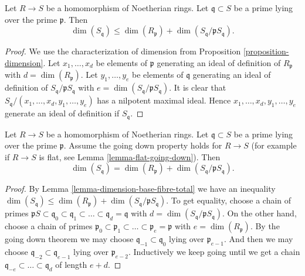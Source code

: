 \begin{lemma}
\label{lemma-dimension-base-fibre-total}
Let $R \to S$ be a homomorphism of Noetherian rings.
Let $\mathfrak q \subset S$ be a prime lying
over the prime $\mathfrak p$. Then
$$
\dim(S_{\mathfrak q})
\leq
\dim(R_{\mathfrak p})
+
\dim(S_{\mathfrak q}/\mathfrak pS_{\mathfrak q}).
$$
\end{lemma}

\begin{proof}
We use the characterization of dimension from
Proposition \ref{proposition-dimension}.
Let $x_1, \ldots, x_d$ be elements of $\mathfrak p$
generating an ideal of definition of $R_{\mathfrak p}$ with
$d = \dim(R_{\mathfrak p})$.
Let $y_1, \ldots, y_e$ be elements of $\mathfrak q$
generating an ideal of definition of
$S_{\mathfrak q}/\mathfrak pS_{\mathfrak q}$
with $e = \dim(S_{\mathfrak q}/\mathfrak pS_{\mathfrak q})$.
It is clear that $S_{\mathfrak q}/(x_1, \ldots, x_d, y_1, \ldots, y_e)$
has a nilpotent maximal ideal. Hence
$x_1, \ldots, x_d, y_1, \ldots, y_e$ generate an ideal of definition
if $S_{\mathfrak q}$.
\end{proof}

\begin{lemma}
\label{lemma-dimension-base-fibre-equals-total}
Let $R \to S$ be a homomorphism of Noetherian rings.
Let $\mathfrak q \subset S$ be a prime lying
over the prime $\mathfrak p$. Assume the going down property holds
for $R \to S$ (for example if $R \to S$ is flat, see
Lemma \ref{lemma-flat-going-down}). Then
$$
\dim(S_{\mathfrak q})
=
\dim(R_{\mathfrak p})
+
\dim(S_{\mathfrak q}/\mathfrak pS_{\mathfrak q}).
$$
\end{lemma}

\begin{proof}
By Lemma \ref{lemma-dimension-base-fibre-total}
we have an inequality
$\dim(S_{\mathfrak q}) \leq
\dim(R_{\mathfrak p}) + \dim(S_{\mathfrak q}/\mathfrak pS_{\mathfrak q})$.
To get equality, choose a chain of primes
$\mathfrak pS \subset \mathfrak q_0 \subset \mathfrak q_1 \subset \ldots
\subset \mathfrak q_d = \mathfrak q$ with
$d = \dim(S_{\mathfrak q}/\mathfrak pS_{\mathfrak q})$.
On the other hand, choose a chain of primes
$\mathfrak p_0 \subset \mathfrak p_1 \subset \ldots \subset \mathfrak p_e
= \mathfrak p$ with $e = \dim(R_{\mathfrak p})$.
By the going down theorem we may choose
$\mathfrak q_{-1} \subset \mathfrak q_0$ lying over
$\mathfrak p_{e-1}$. And then we may choose
$\mathfrak q_{-2} \subset \mathfrak q_{e-1}$ lying over
$\mathfrak p_{e-2}$. Inductively we keep going until we
get a chain
$\mathfrak q_{-e} \subset \ldots \subset \mathfrak q_d$
of length $e + d$.
\end{proof}

